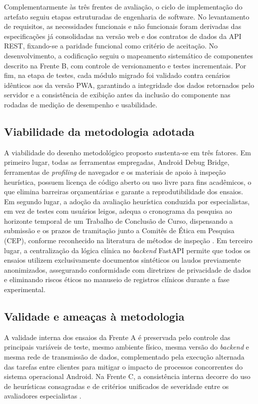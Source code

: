 \documentclass[12pt]{article}
\begin{document}
Complementarmente às três frentes de avaliação, o ciclo de implementação do artefato seguiu etapas estruturadas de engenharia de software. No levantamento de requisitos, as necessidades funcionais e não funcionais foram derivadas das especificações já consolidadas na versão web e dos contratos de dados da API REST, fixando-se a paridade funcional como critério de aceitação. No desenvolvimento, a codificação seguiu o mapeamento sistemático de componentes descrito na Frente B, com controle de versionamento e testes incrementais. Por fim, na etapa de testes, cada módulo migrado foi validado contra cenários idênticos aos da versão PWA, garantindo a integridade dos dados retornados pelo servidor e a consistência de exibição antes da inclusão do componente nas rodadas de medição de desempenho e usabilidade.

\subsection{Viabilidade da metodologia adotada}

A viabilidade do desenho metodológico proposto sustenta-se em três fatores. Em primeiro lugar, todas as ferramentas empregadas, Android Debug Bridge, ferramentas de \emph{profiling} de navegador e os materiais de apoio à inspeção heurística, possuem licença de código aberto ou uso livre para fins acadêmicos, o que elimina barreiras orçamentárias e garante a reprodutibilidade dos ensaios. Em segundo lugar, a adoção da avaliação heurística conduzida por especialistas, em vez de testes com usuários leigos, adequa o cronograma da pesquisa ao horizonte temporal de um Trabalho de Conclusão de Curso, dispensando a submissão e os prazos de tramitação junto a Comitês de Ética em Pesquisa (CEP), conforme reconhecido na literatura de métodos de inspeção \cite{cardieri2018}. Em terceiro lugar, a centralização da lógica clínica no \emph{backend} FastAPI permite que todos os ensaios utilizem exclusivamente documentos sintéticos ou laudos previamente anonimizados, assegurando conformidade com diretrizes de privacidade de dados e eliminando riscos éticos no manuseio de registros clínicos durante a fase experimental.

\subsection{Validade e ameaças à metodologia}

A validade interna dos ensaios da Frente A é preservada pelo controle das principais variáveis de teste, mesmo ambiente físico, mesma versão do \emph{backend} e mesma rede de transmissão de dados, complementado pela execução alternada das tarefas entre clientes para mitigar o impacto de processos concorrentes do sistema operacional Android. Na Frente C, a consistência interna decorre do uso de heurísticas consagradas e de critérios unificados de severidade entre os avaliadores especialistas \cite{cardieri2018, nielsen1994}.
\end{document}
